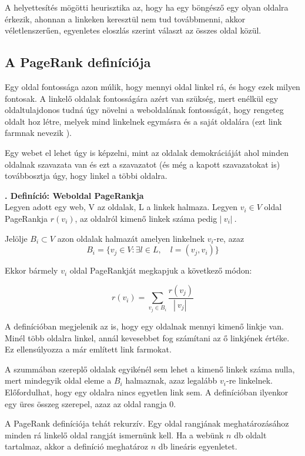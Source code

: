 \documentclass[12pt,a4paper]{article}
\newcounter{definicioszam}
\newenvironment{definicio}[1]
{{\medskip}\noindent \stepcounter{definicioszam}
{\bfseries{\thedefinicioszam. Definíció: #1\\[1ex]}}}{\bigskip }
\begin{document}
\vspace{0.5 cm}

A helyettesítés mögötti heurisztika az, hogy ha egy böngésző egy olyan oldalra érkezik, ahonnan a linkeken keresztül nem tud továbbmenni, akkor véletlenszerűen, egyenletes eloszlás szerint választ az összes oldal közül.

\subsection{A PageRank definíciója}

Egy oldal fontossága azon múlik, hogy mennyi oldal linkel rá, és hogy ezek milyen fontosak. A linkelő oldalak fontosságára azért van szükség, mert enélkül egy oldaltulajdonos tudná úgy növelni a weboldalának fontosságát, hogy rengeteg oldalt hoz létre, melyek mind linkelnek egymásra és a saját oldalára (ezt link farmnak nevezik \cite{lang}).

Egy webet el lehet úgy is képzelni, mint az oldalak demokráciáját ahol minden oldalnak szavazata van és ezt a szavazatot (és még a kapott szavazatokat is) továbbosztja úgy, hogy linkel a többi oldalra.

\begin{definicio}{Weboldal PageRankja}
	Legyen adott egy web, V az oldalak, L a linkek halmaza.
	Legyen $v_i \in V$ oldal PageRankja $r(v_i)$, az oldalról kimenő linkek száma pedig $ |\ v_i |\ $. 
	
	Jelölje $B_i \subset V$ azon oldalak halmazát amelyen linkelnek $v_i$-re, azaz
	\[B_i = \{ v_j \in V: \exists l \in L, \quad l = (v_j,v_i) \} \]
	
	Ekkor bármely $v_i$ oldal PageRankját megkapjuk a következő módon:
	
	\[ r(v_i) = \sum_{v_j \in B_i} \frac{r(v_j)}{ |\ v_j|\ } \]
\end{definicio}

A definícióban megjelenik az is, hogy egy oldalnak mennyi kimenő linkje van. Minél több oldalra linkel, annál kevesebbet fog számítani az ő linkjének értéke. Ez ellensúlyozza a már említett link farmokat.

A szummában szereplő oldalak egyikénél sem lehet a kimenő linkek száma nulla, mert mindegyik oldal eleme a $B_i$ halmaznak, azaz legalább $v_i$-re linkelnek. Előfordulhat, hogy egy oldalra nincs egyetlen link sem. A definícióban ilyenkor egy üres összeg szerepel, azaz az oldal rangja 0.

\bigskip

A PageRank definíciója tehát rekurzív. Egy oldal rangjának meghatározásához minden rá linkelő oldal rangját ismernünk kell. Ha a webünk $n$ db oldalt tartalmaz, akkor a definíció meghatároz $n$ db lineáris egyenletet.
\end{document}
